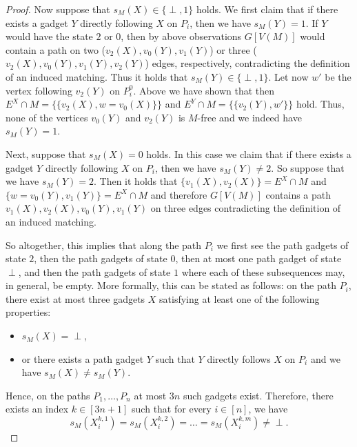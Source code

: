 \documentclass[a4paper,UKenglish,cleveref, autoref, thm-restate]{lipics-v2021}
\begin{document}
\begin{proof}
    Now suppose that $s_M(X) \in \{\perp, 1\}$ holds.
    We first claim that if there exists a gadget $Y$ directly following $X$ on $P_i$, then we have $s_M(Y) = 1$.
    If $Y$ would have the state $2$ or $0$, then by above observations $G[V(M)]$ would contain a path on two ($v_2(X), v_0(Y), v_1(Y)$) or three ($v_2(X), v_0(Y), v_1(Y), v_2(Y)$) edges, respectively, contradicting the definition of an induced matching.
    Thus it holds that $s_M(Y) \in \{\perp, 1\}$.
    Let now $w'$ be the vertex following $v_2(Y)$ on $P_i^0$.
    Above we have shown that then $E^X \cap M = \{\{v_2(X), w = v_0(X)\}\}$ and $E^Y \cap M = \{\{v_2(Y), w'\}\}$ hold. 
    Thus, none of the vertices $v_0(Y)$ and $v_2(Y)$ is $M$-free 
    and we indeed have $s_M(Y) = 1$. 
    
    Next, suppose that $s_M(X) = 0$ holds.
    In this case we claim that if there exists a gadget $Y$ directly following $X$ on $P_i$, then we have $s_M(Y) \neq 2$.
    So suppose that we have $s_M(Y) = 2$.
    Then it holds that $\{v_1(X), v_2(X)\} = E^X \cap M$ and $\{w = v_0(Y), v_1(Y)\} = E^X \cap M$ and therefore $G[V(M)]$ contains a path $v_1(X), v_2(X), v_0(Y), v_1(Y)$ on three edges contradicting the definition of an induced matching.
    
    So altogether, this implies that along the path $P_i$ we first see the path gadgets of state $2$, then the path gadgets of state $0$, then at most one path gadget of state $\perp$, and then the path gadgets of state $1$ where each of these subsequences may, in general, be empty.
    More formally, this can be stated as follows: on the path $P_i$, there exist at most three gadgets $X$ satisfying at least one of the following properties:
    \begin{itemize}
        \item $s_M(X) = \perp$,
        \item or there exists a path gadget $Y$ such that $Y$ directly follows $X$ on $P_i$ and we have $s_M(X) \neq s_M(Y)$.
    \end{itemize}
    Hence, on the paths $P_1, \dots, P_n$ at most $3n$ such gadgets exist.
    Therefore, there exists an index $k \in [3n+1]$ such that for every $i \in [n]$, we have
    \[
        s_M(X_i^{k,1}) = s_M(X_i^{k,2}) = \dots = s_M(X_i^{k,m}) \neq \perp.
    \]
    

\end{proof}
\end{document}
